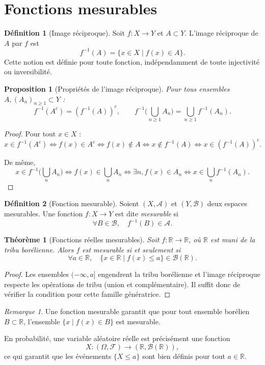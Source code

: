\documentclass{article}
\theoremstyle{remark}
\newtheorem*{remark}{Remarque}
\theoremstyle{definition}
\newtheorem{definition}{Définition}[section]
\theoremstyle{plain}
\newtheorem{theorem}{Théorème}[section]
\newtheorem{proposition}{Proposition}[section]
\begin{document}
\section{Fonctions mesurables}

\begin{definition}[Image réciproque]
Soit $f : X \to Y$ et $A \subset Y$.  
L'image réciproque de $A$ par $f$ est
\[
f^{-1}(A) = \{x \in X \mid f(x) \in A\}.
\]
Cette notion est définie pour toute fonction, indépendamment de toute injectivité ou inversibilité.
\end{definition}

\begin{proposition}[Propriétés de l'image réciproque]
Pour tous ensembles $A, (A_n)_{n\ge1} \subset Y$ :
\[
f^{-1}(A^c) = (f^{-1}(A))^c,
\qquad
f^{-1}\Big(\bigcup_{n\ge1} A_n\Big) = \bigcup_{n\ge1} f^{-1}(A_n).
\]
\end{proposition}

\begin{proof}
Pour tout $x \in X$ :
\[
x \in f^{-1}(A^c) \iff f(x) \in A^c \iff f(x) \notin A \iff x \notin f^{-1}(A) \iff x \in (f^{-1}(A))^c.
\]

De même,
\[
x \in f^{-1}\Big(\bigcup_n A_n\Big) \iff f(x) \in \bigcup_n A_n \iff \exists n, f(x) \in A_n \iff x \in \bigcup_n f^{-1}(A_n).
\]
\end{proof}

\begin{definition}[Fonction mesurable]
Soient $(X,\mathcal A)$ et $(Y,\mathcal B)$ deux espaces mesurables.  
Une fonction $f : X \to Y$ est dite \emph{mesurable} si
\[
\forall B \in \mathcal B, \quad f^{-1}(B) \in \mathcal A.
\]
\end{definition}

\begin{theorem}[Fonctions réelles mesurables]
Soit $f : \mathbb R \to \mathbb R$, où $\mathbb R$ est muni de la tribu borélienne.  
Alors $f$ est mesurable si et seulement si
\[
\forall a \in \mathbb R, \quad \{x \in \mathbb R \mid f(x) \le a \} \in \mathcal B(\mathbb R).
\]
\end{theorem}

\begin{proof}
Les ensembles $(-\infty,a]$ engendrent la tribu borélienne et l'image réciproque respecte
les opérations de tribu (union et complémentaire). Il suffit donc de vérifier la condition pour cette famille génératrice.
\end{proof}

\begin{remark}
Une fonction mesurable garantit que pour tout ensemble borélien $B \subset \mathbb R$,  
l'ensemble $\{x \mid f(x) \in B\}$ est mesurable.  

En probabilité, une variable aléatoire réelle est précisément une fonction
\[
X : (\Omega, \mathcal F) \to (\mathbb R, \mathcal B(\mathbb R)),
\]  
ce qui garantit que les événements $\{X \le a\}$ sont bien définis pour tout $a \in \mathbb R$.
\end{remark}
\end{document}
